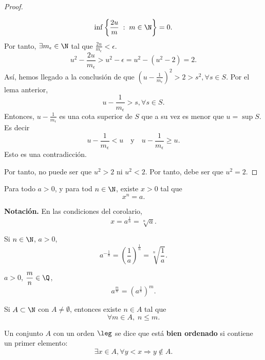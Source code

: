 \begin{proof}
\begin{description}
\[\inf \left\{ \frac{2u}{m} \; : \; m \in \N\right\} = 0 .\]
Por tanto, $\displaystyle \exists m_{\epsilon } \in \N $ tal que $\displaystyle \frac{2u}{m_{\epsilon }} < \epsilon  $.
\[u^{2} - \frac{2u}{m_{\epsilon }} > u^{2} - \epsilon = u^{2} - \left(u^{2} - 2\right) = 2 .\]
Así, hemos llegado a la conclusión de que $\displaystyle \left(u - \frac{1}{m_{\epsilon }}\right)^{2} > 2 > s^{2}, \forall s \in S $. Por el lema anterior, 
\[u - \frac{1}{m_{\epsilon }} > s, \forall s \in S .\]
Entonces, $\displaystyle u - \frac{1}{m_{\epsilon }} $ es una cota superior de $\displaystyle S $ que a su vez es menor que $\displaystyle u = \sup S $. Es decir
\[u - \frac{1}{m_{\epsilon }} < u \quad \text{y} \quad u - \frac{1}{m_{\epsilon }} \geq u .\]
Esto es una contradicción.
\end{description}
Por tanto, no puede ser que $\displaystyle u^{2}>2 $ ni $\displaystyle u^{2} <2 $. Por tanto, debe ser que $\displaystyle u^{2} = 2 $. 
\end{proof}

\begin{fcolorary}[]
\normalfont Para todo $\displaystyle a > 0 $, y para tod $\displaystyle n \in \N $, existe $\displaystyle x > 0 $ tal que 
\[x^{n} = a .\]
\end{fcolorary}

\textbf{Notación.} En las condiciones del corolario, 
\[x = a ^{\frac{1}{n}} = \sqrt[n]{a} .\]

\begin{fdefinition}[]
\normalfont Si $\displaystyle n \in \N $, $\displaystyle a > 0 $, 
\[a ^{- \frac{1}{n}} = \left(\frac{1}{a}\right)^{\frac{1}{n}} = \sqrt[n]{\frac{1}{a}} .\]
\end{fdefinition}

\begin{fdefinition}[]
\normalfont $\displaystyle a > 0 $, $\displaystyle \frac{m}{n} \in \Q $, 
\[a^{\frac{m}{n}} = \left(a^{\frac{1}{n}}\right)^{m} .\]
\end{fdefinition}

\begin{fprop}
\normalfont Si $\displaystyle A \subset \N $ con $\displaystyle A \neq \emptyset $, entonces existe $\displaystyle n \in A $ tal que 
\[\forall m \in A, \; n \leq m .\]
\end{fprop}

\begin{fdefinition}[]
\normalfont Un conjunto $\displaystyle A $ con un orden $\displaystyle \leg $ se dice que está \textbf{bien ordenado} si contiene un primer elemento:
\[\exists x \in A, \forall y < x \Rightarrow y \not\in A .\]

\end{fdefinition}

